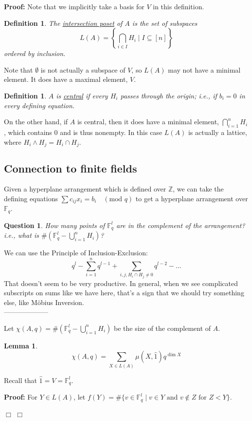 \documentclass[11pt]{article}
\newtheorem{lemma}[theorem]{Lemma}
\newtheorem{definition}[theorem]{Definition}
\newtheorem{question}[theorem]{Question}
\newenvironment{proof}{\noindent \textbf{Proof:}}{$\Box$}
\newcommand{\Z}{\mathbb Z}  %
\newcommand{\F}{\mathbb F} %
\newcommand{\modulo}[1]{\quad (\mbox{mod }{#1})} %
\newcommand{\und}[1]{\underline{#1}}
\begin{document}
\begin{proof}
Note that we implicitly take a basis for $V$ in this definition.
\begin{definition}
	The \und{intersection poset} of $A$ is the set of subspaces $$L(A) = \left\{\bigcap_{i \in I} H_i \mid I \subseteq [n]\right\}$$ ordered by inclusion.
\end{definition}

Note that $\emptyset$ is not actually a subspace of $V$, so $L(A)$ may not have a minimal element. It does have a maximal element, $V$.

\begin{definition}
	$A$ is \und{central} if every $H_i$ passes through the origin; i.e., if $b_i=0$ in every defining equation.
\end{definition}

On the other hand, if $A$ is central, then it does have a minimal element, $\bigcap_{i=1}^n H_i$, which contains $0$ and is thus nonempty. In this case $L(A)$ is actually a lattice, where $H_i \wedge H_j = H_i \cap H_j$.

\subsection{Connection to finite fields}
Given a hyperplane arrangement which is defined over $\Z$, we can take the defining equations $\sum c_{ij} x_i = b_i \modulo q$ to get a hyperplane arrangement over $\F_q$.
\begin{question}
	How many points of $\F_q^l$ are in the complement of the arrangement? i.e., what is $\#\left(\F_q^l - \bigcup_{i=1}^n H_i \right)$?
\end{question}

We can use the Principle of Inclusion-Exclusion:
$$ q^l - \sum_{i=1}^n q^{l-1} + \sum_{i,j, H_i \cap H_j \neq 0} q^{l-2} - \ldots$$
That doesn't seem to be very productive. In general, when we see complicated subscripts on sums like we have here, that's a sign that we should try something else, like M\"{o}bius Inversion.\\
--------------------

Let $\chi(A,q) = \#(\F_q^l - \bigcup_{i=1}^n H_i )$ be the size of the complement of $A$.
\begin{lemma}
	$$\chi(A,q) = \sum_{X\in L(A)} \mu(X, \hat{1}) q^{\dim X}$$
\end{lemma}
	Recall that $\hat{1} = V = \F_q^l$. 
	
\begin{proof}
	For $Y \in L(A)$, let $f(Y) = \# \{ v \in \F_q^l \mid v \in Y \text{ and } v \notin Z \text{ for } Z < Y \}$. 
	

\end{proof}
\end{proof}
\end{document}
